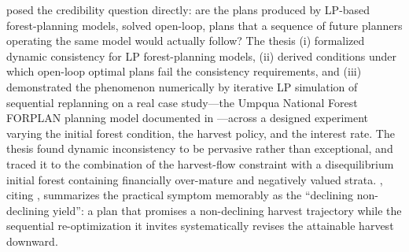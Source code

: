\citet{daugherty1991credibility} posed the credibility question directly: are the plans produced by LP-based forest-planning models, solved open-loop, plans that a sequence of future planners operating the same model would actually follow? The thesis (i) formalized dynamic consistency for LP forest-planning models, (ii) derived conditions under which open-loop optimal plans fail the consistency requirements, and (iii) demonstrated the phenomenon numerically by iterative LP simulation of sequential replanning on a real case study---the Umpqua National Forest FORPLAN planning model documented in \citep{usda1987umpqua}---across a designed experiment varying the initial forest condition, the harvest policy, and the interest rate. The thesis found dynamic inconsistency to be pervasive rather than exceptional, and traced it to the combination of the harvest-flow constraint with a disequilibrium initial forest containing financially over-mature and negatively valued strata. \citet[pp.~331--332]{gunn2007models}, citing \citet{daugherty1991credibility}, summarizes the practical symptom memorably as the ``declining non-declining yield'': a plan that promises a non-declining harvest trajectory while the sequential re-optimization it invites systematically revises the attainable harvest downward.

